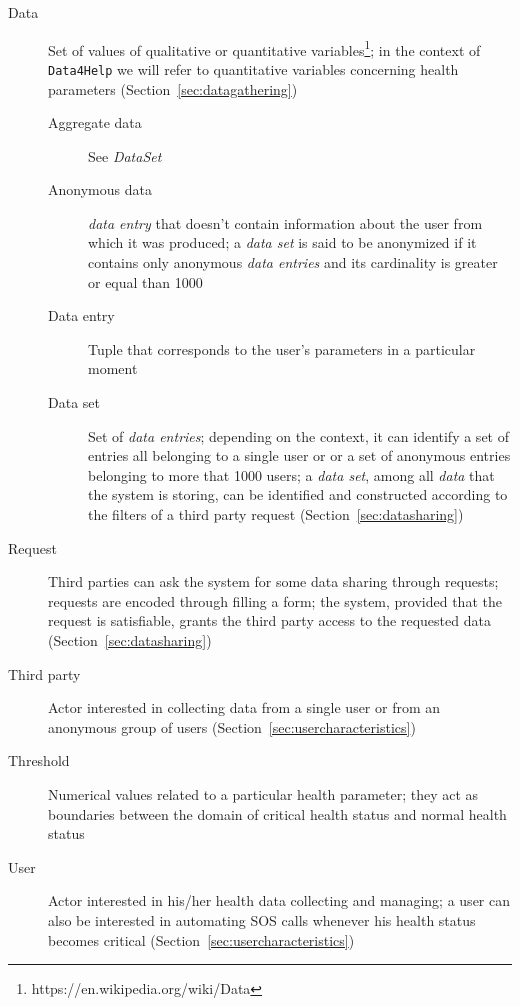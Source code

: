     \begin{description}
      \item[Data] Set of values of qualitative or quantitative variables\footnote{https://en.wikipedia.org/wiki/Data}; in the context of \texttt{Data4Help} we will refer to quantitative variables concerning health parameters (Section~\ref{sec:datagathering})
      \begin{description}
        \item[Aggregate data] See \textit{DataSet}
        \item[Anonymous data] \textit{data entry} that doesn't contain information about the user from which it was produced; a \textit{data set} is said to be anonymized if it contains only anonymous \textit{data entries} and its cardinality is greater or equal than 1000
        \item[Data entry] Tuple that corresponds to the user's parameters in a particular moment
        \item[Data set] Set of \textit{data entries}; depending on the context, it can identify a set of entries all belonging to a single user or or a set of anonymous entries belonging to more that 1000 users; a \textit{data set}, among all \textit{data} that the system is storing, can be identified and constructed according to the filters of a third party request (Section~\ref{sec:datasharing})
      \end{description}
      \item[Request] Third parties can ask the system for some data sharing through requests; requests are encoded through filling a form; the system, provided that the request is satisfiable, grants the third party access to the requested data (Section~\ref{sec:datasharing})
      \item[Third party] Actor interested in collecting data from a single user or from an anonymous group of users (Section~\ref{sec:usercharacteristics})
      \item[Threshold] Numerical values related to a particular health parameter; they act as boundaries between the domain of critical health status and normal health status
      \item[User] Actor interested in his/her health data collecting and managing; a user can also be interested in automating SOS calls whenever his health status becomes critical (Section~\ref{sec:usercharacteristics})

    \end{description}

